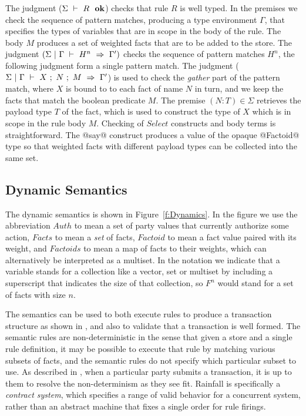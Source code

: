 The judgment ($\Sigma ~\vdash~ R~~ \textbf{ok}$) checks that rule $R$ is well typed. In the premises we check the sequence of pattern matches, producing a type environment $\Gamma$, that specifies the types of variables that are in scope in the body of the rule. The body $M$ produces a set of weighted facts that are to be added to the store. The judgment $(\Sigma~|~\Gamma~\vdash~H^n~\Rightarrow~\Gamma')$ checks the sequence of pattern matches $H^n$, the following judgment form a single pattern match. The judgment ($\Sigma~|~\Gamma~\vdash~X ~;~ N ~;~ M~\Rightarrow~\Gamma'$) is used to check the \emph{gather} part of the pattern match, where $X$ is bound to to each fact of name $N$ in turn, and we keep the facts that match the boolean predicate $M$. The premise $(N:T) \in \Sigma$ retrieves the payload type $T$ of the fact, which is used to construct the type of $X$ which is in scope in the rule body $M$. Checking of $Select$ constructs and body terms is straightforward. The @say@ construct produces a value of the opaque @Factoid@ type so that weighted facts with different payload types can be collected into the same set.





\subsection{Dynamic Semantics}
The dynamic semantics is shown in Figure~\ref{f:Dynamics}. In the figure we use the abbreviation $Auth$ to mean a set of party values that currently authorize some action, $Facts$ to mean a \emph{set} of facts, $Factoid$ to mean a fact value paired with its weight, and $Factoids$ to mean a map of facts to their weights, which can alternatively be interpreted as a multiset. In the notation we indicate that a variable stands for a collection like a vector, set or multiset by including a superscript that indicates the size of that collection, so $F^n$ would stand for a set of facts with size $n$.

The semantics can be used to both execute rules to produce a transaction structure as shown in \REF, and also to validate that a transaction is well formed. The semantic rules are non-deterministic in the sense that given a store and a single rule definition, it may be possible to execute that rule by matching various subsets of facts, and the semantic rules do not specify which particular subset to use. As described in \REF, when a particular party submits a transaction, it is up to them to resolve the non-determinism as they see fit. Rainfall is specifically a \emph{contract system}, which specifies a range of valid behavior for a concurrent system, rather than an abstract machine that fixes a single order for rule firings.

